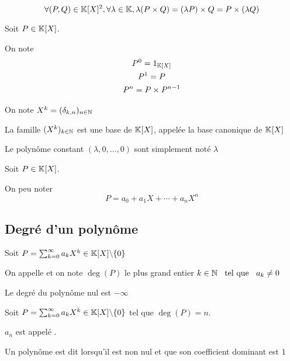 \begin{prp}
  \[
    \forall (P, Q) \in \mathbb{K}[X]^2, \forall \lambda \in \mathbb{K}, \lambda (P \times Q) = (\lambda P) \times Q = P \times (\lambda Q)
  \]
\end{prp}

\begin{dfn}
  Soit $P \in \mathbb{K}[X]$.

  On note
  \begin{gather*}
    P^0 = 1_{\mathbb{K}[X]} \\
    P^1 = P \\
    P^n = P \times P^{n - 1}
  \end{gather*}

  On note $X^k = (\delta_{k, n})_{n \in \mathbb{N}}$
\end{dfn}

\begin{prp}
  La famille $(X^k)_{k \in \mathbb{N}}$ est une base de $\mathbb{K}[X]$, appelée la base
  canonique de $\mathbb{K}[X]$
\end{prp}
  

\begin{dfn}
  Le polynôme constant $(\lambda, 0, \ldots, 0)$ sont simplement noté
  $\lambda$
\end{dfn}

\begin{dfn}
  Soit $P \in \mathbb{K}[X]$.

  On peu noter
  \[
    P = a_0 + a_1 X + \cdots + a_n X^n
  \]
\end{dfn}

\subsection{Degré d'un polynôme}

\begin{dfn}
  Soit $P = \sum^\infty_{k = 0} a_k X^k \in \mathbb{K}[X] \backslash \{0\}$

  On appelle  et on note $\deg(P)$ le plus grand entier
  $k \in \mathbb{N} \;\;\text{ tel que }\;\; a_k \neq 0$

  Le degré du polynôme nul est $- \infty$
\end{dfn}

\begin{dfn}
  Soit $P = \sum^\infty_{k = 0} a_k X^k \in \mathbb{K}[X] \backslash \{0\}$ tel que
  $\deg(P) = n$.

  $a_n$ est appelé .
\end{dfn}

\begin{dfn}
  Un polynôme est dit  lorsqu'il est non nul
  et que son coefficient dominant est $1$
\end{dfn}

